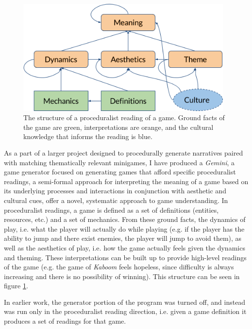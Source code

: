 \documentclass[12pt]{report}
\begin{document}
\begin{figure}[ht]
\centering
    \includegraphics[width=0.97\textwidth]{figures/Proceduralist_Readings_Graph.png}
    \caption{The structure of a proceduralist reading of a game.  Ground facts of the game are green, interpretations are orange, and the cultural knowledge that informs the reading is blue.}
  \label{fig:proc_read}
\end{figure}
  As a part of a larger project designed to procedurally generate narratives paired with matching thematically relevant minigames, I have produced a \textit{Gemini}, a game generator focused on generating games that afford specific proceduralist readings, a semi-formal approach for interpreting the meaning of a game based on its underlying processes and interactions in conjunction with aesthetic and cultural cues, offer a novel, systematic approach to game understanding.  In proceduralist readings, a game is defined as a set of definitions (entities, resources, etc.) and a set of mechanics.  From these ground facts, the dynamics of play, i.e. what the player will actually do while playing (e.g. if the player has the ability to jump and there exist enemies, the player will jump to avoid them), as well as the aesthetics of play, i.e. how the game actually feels given the dynamics and theming.  These interpretations can be built up to provide high-level readings of the game (e.g. the game of \textit{Kaboom} feels hopeless, since difficulty is always increasing and there is no possibility of winning).  This structure can be seen in figure \ref{fig:proc_read}.
  
In earlier work, the generator portion of the program was turned off, and instead was run only in the proceduralist reading direction, i.e. given a game definition it produces a set of readings for that game.
  
\end{document}
